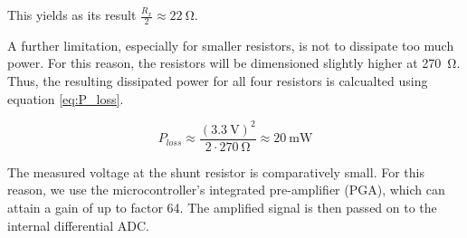 This yields as its result $\frac{R_x}{2} \approx \SI{22}{\ohm}$.


\begin{minipage}{.50\textwidth}
    A  further  limitation,  especially  for  smaller  resistors,  is  not  to
    dissipate  too  much  power. For  this   reason,  the  resistors  will  be
    dimensioned  slightly   higher  at  \SI{270}{\ohm}. Thus,   the  resulting
    dissipated  power for  all  four resistors  is  calcualted using  equation
    \ref{eq:P_loss}.
\end{minipage}
\begin{minipage}{.50\textwidth}
    \begin{equation} \label{eq:P_loss}
        P_{loss} \approx \frac{\left(\SI{3.3}{\volt}\right)^2}{2\cdot \SI{270}{\ohm}} \approx \SI{20}{\milli\watt}
    \end{equation}
\end{minipage}

The measured  voltage at the  shunt resistor is comparatively  small. For this
reason, we use the microcontroller's integrated pre-amplifier (PGA), which can
attain a gain  of up to factor  64. The amplified signal is then  passed on to
the internal differential ADC.
